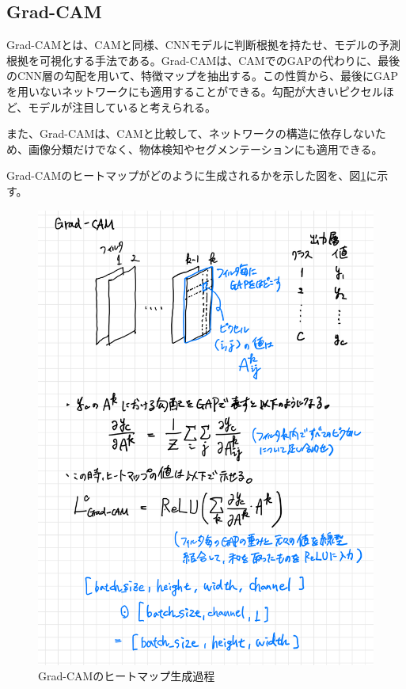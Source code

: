 \documentclass{ltjsarticle}
\begin{document}
\subsection{Grad-CAM}
Grad-CAMとは、CAMと同様、CNNモデルに判断根拠を持たせ、モデルの予測根拠を可視化する手法である。Grad-CAMは、CAMでのGAPの代わりに、最後のCNN層の勾配を用いて、特徴マップを抽出する。この性質から、最後にGAPを用いないネットワークにも適用することができる。勾配が大きいピクセルほど、モデルが注目していると考えられる。
\par
また、Grad-CAMは、CAMと比較して、ネットワークの構造に依存しないため、画像分類だけでなく、物体検知やセグメンテーションにも適用できる。
\par
Grad-CAMのヒートマップがどのように生成されるかを示した図を、図\ref{fig:Grad-CAM}に示す。
\begin{figure}
  \centering
  \includegraphics[width=14cm]{./capture/Grad-CAM.png}
  \caption{Grad-CAMのヒートマップ生成過程}
  \label{fig:Grad-CAM}
\end{figure}
\end{document}
